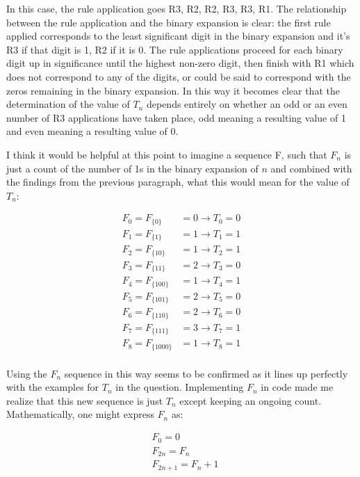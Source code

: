 \documentclass{article}
\begin{document}
\par

In this case, the rule application goes R3, R2, R2, R3, R3, R1.  The relationship between the rule application and the binary expansion is clear: the first rule applied corresponds to the least significant digit in the binary expansion and it's R3 if that digit is 1, R2 if it is 0.  The rule applications proceed for each binary digit up in significance until the highest non-zero digit, then finish with R1 which does not correspond to any of the digits, or could be said to correspond with the zeros remaining in the binary expansion.  In this way it becomes clear that the determination of the value of $T_n$ depends entirely on whether an odd or an even number of R3 applications have taken place, odd meaning a resulting value of 1 and even meaning a resulting value of 0.

\par

I think it would be helpful at this point to imagine a sequence F, such that $F_n$ is just a count of the number of 1s in the binary expansion of $n$ and combined with the findings from the previous paragraph, what this would mean for the value of $T_n$:

\begin{align*}
    F_0 = F_{\{0\}} &= 0 \rightarrow T_0 = 0 \\
    F_1 = F_{\{1\}} &= 1 \rightarrow T_1 = 1 \\
    F_2 = F_{\{10\}} &= 1 \rightarrow T_2 = 1 \\
    F_3 = F_{\{11\}} &= 2 \rightarrow T_3 = 0 \\
    F_4 = F_{\{100\}} &= 1 \rightarrow T_4 = 1 \\
    F_5 = F_{\{101\}} &= 2 \rightarrow T_5 = 0 \\
    F_6 = F_{\{110\}} &= 2 \rightarrow T_6 = 0 \\
    F_7 = F_{\{111\}} &= 3 \rightarrow T_7 = 1 \\
    F_8 = F_{\{1000\}} &= 1 \rightarrow T_8 = 1 \\
\end{align*}

Using the $F_n$ sequence in this way seems to be confirmed as it lines up perfectly with the examples for $T_n$ in the question.  Implementing $F_n$ in code made me realize that this new sequence is just $T_n$ except keeping an ongoing count.  Mathematically, one might express $F_n$ as:

\begin{align*}
    &F_0 = 0 \\
    &F_{2n} = F_n \\
    &F_{2n + 1} = F_n + 1
\end{align*}
\end{document}
